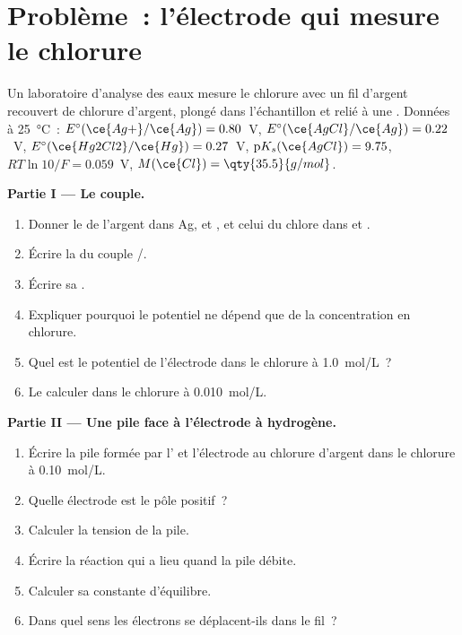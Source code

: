 \section{Problème~: l'électrode qui mesure le chlorure}

\begin{problem}
\label{pb:b1:nernst:1}
Un laboratoire d'analyse des eaux mesure le chlorure avec un fil
d'argent recouvert de chlorure d'argent, plongé dans l'échantillon et
relié à une . Données à \qty{25}{\celsius}~:
$E^\circ(\ce{Ag+}/\ce{Ag}) = 0.80$~V,
$E^\circ(\ce{AgCl}/\ce{Ag}) = 0.22$~V, $E^\circ(\ce{Hg2Cl2}/\ce{Hg}) =
0.27$~V, $\mathrm{p}K_s(\ce{AgCl}) = 9.75$, $RT\ln 10/F = 0.059$~V,
$M(\ce{Cl}) = \qty{35.5}{g/mol}$.

\medskip
\noindent\textbf{Partie I --- Le couple.}
\begin{enumerate}
  \item Donner le  de l'argent dans Ag,  et
        , et celui du chlore dans  et .
  \item Écrire la  du couple /.
  \item Écrire sa .
  \item Expliquer pourquoi le potentiel ne dépend que de la concentration
        en chlorure.
  \item Quel est le potentiel de l'électrode dans le chlorure à
        \qty{1.0}{mol/L}~?
  \item Le calculer dans le chlorure à \qty{0.010}{mol/L}.
\end{enumerate}

\medskip
\noindent\textbf{Partie II --- Une pile face à l'électrode à hydrogène.}
\begin{enumerate}[resume]
  \item Écrire la pile formée par l' et
        l'électrode au chlorure d'argent dans le chlorure à
        \qty{0.10}{mol/L}.
  \item Quelle électrode est le pôle positif~?
  \item Calculer la tension de la pile.
  \item Écrire la réaction qui a lieu quand la pile débite.
  \item Calculer sa constante d'équilibre.
  \item Dans quel sens les électrons se déplacent-ils dans le fil~?
\end{enumerate}


\end{problem}
